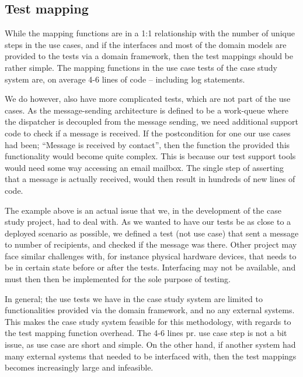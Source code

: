 \subsection{Test mapping}
While the mapping functions are in a 1:1 relationship with the number of unique steps in the use cases, and if the interfaces and most of the domain models are provided to the tests via a domain framework, then the test mappings should be rather simple. The mapping functions in the use case tests of the case study system are, on average 4-6 lines of code -- including log statements.\medskip

\noindent We do however, also have more complicated tests, which are not part of the use cases. As the message-sending architecture is defined to be a work-queue where the dispatcher is decoupled from the message sending, we need additional support code to check if a message is received. If the postcondition for one our use cases had been; ``Message is received by contact'', then the function the provided this functionality would become quite complex. This is because our test support tools would need some way accessing an email mailbox. The single step of asserting that a message is actually received, would then result in hundreds of new lines of code.\medskip

\noindent The example above is an actual issue that we, in the development of the case study project, had to deal with. As we wanted to have our tests be as close to a deployed scenario as possible, we defined a test (not use case) that sent a message to number of recipients, and checked if the message was there. Other project may face similar challenges with, for instance physical hardware devices, that needs to be in certain state before or after the tests. Interfacing may not be available, and must then then be implemented for the sole purpose of testing.\medskip

\noindent In general; the use tests we have in the case study system are limited to functionalities provided via the domain framework, and no any external systems. This makes the case study system feasible for this methodology, with regards to the test mapping function overhead. The 4-6 lines pr. use case step is not a bit issue, as use case are short and simple. On the other hand, if another system had many external systems that needed to be interfaced with, then the test mappings becomes increasingly large and infeasible.

